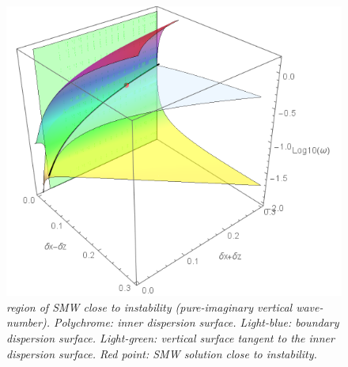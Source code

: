 \documentclass[a4paper,11pt]{article}
\begin{document}
\begin{figure}[!h]
	\centering		
	\includegraphics[width=0.5\linewidth]{FIGURES/Fig_Delta.png}
	\caption{\textit{region of SMW close to instability (pure-imaginary vertical wave-number). Polychrome: inner dispersion surface. Light-blue: boundary dispersion surface. Light-green: vertical surface tangent to the inner dispersion surface. Red point: SMW solution close to instability. }}
	\label{FigDelta}
\end{figure}
\end{document}
